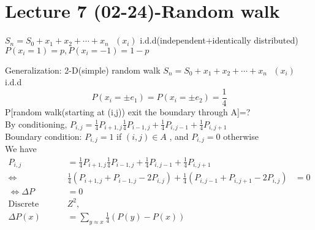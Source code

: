     \section{Lecture 7 (02-24)-{Random walk}}
    \begin{definition}{}
    $ S_n=S_0+x_1+x_2+\cdots+x_n \text{ }(x_i)$ i.d.d(independent+identically distributed)\\
    $ P(x_i=1)=p,P(x_i=-1)=1-p $
    \end{definition}
    Generalization: 2-D(simple) random walk
    $ S_n=S_0+x_1+x_2+\cdots+x_n \text{ }(x_i)$ i.d.d
    $$
        P(x_i=\pm e_1)=P(x_i=\pm e_2)=\frac{1}{4}
    $$ 
    P[random walk(starting at (i,j)) exit the boundary through A]=?
    \\By conditioning, $ P_{i,j}=\frac{1}{4}P_{i+1,j}\frac{1}{4}P_{i-1,j}+\frac{1}{4}P_{i,j-1}+\frac{1}{4}P_{i,j+1} $ \\
    Boundary condition: $ P_{i,j}=1 $ if $ (i,j)\in A $ , and $ P_{i,j}=0 $ otherwise
    \\We have \begin{align*}{}{}
        P_{i,j}&=\frac{1}{4}P_{i+1,j}\frac{1}{4}P_{i-1,j}+\frac{1}{4}P_{i,j-1}+\frac{1}{4}P_{i,j+1}\\
        \Leftrightarrow &\frac{1}{4}(P_{i+1,j}+P_{i-1,j}-2P_{i,j})+\frac{1}{4}(P_{i,j-1}+P_{i,j+1}-2P_{i,j})&=0\\
        \Leftrightarrow \Delta P&=0\\
        \text{Discrete Laplacian on } &Z^2,\\
        \Delta P(x)&=\sum_{y\approx x}\frac{1}{4}(P(y)-P(x))
    \end{align*} 
